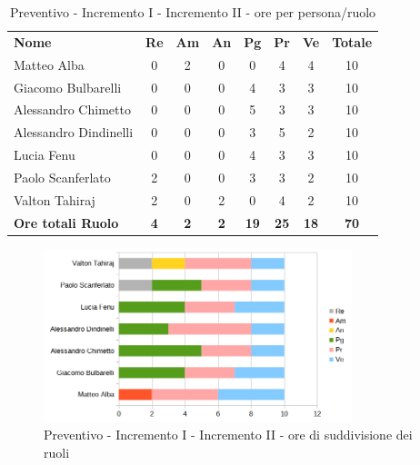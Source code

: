 	\begin{table} [h!]
	\begin{center}
		\begin{tabular} { m{3.5cm} c c c c c c c }
			\rowcolor{lightgray}
			\textbf{Nome} & \textbf{Re} & \textbf{Am} & \textbf{An} & \textbf{Pg} & \textbf{Pr} & \textbf{Ve} & \textbf{Totale} \\
			Matteo Alba &0 &2 & 0& 0 &4 & 4 & 10 \\
			Giacomo Bulbarelli & 0 &0 & 0& 4 & 3 & 3 & 10 \\
			Alessandro Chimetto & 0 & 0& 0& 5 & 3 & 3 & 10 \\
			Alessandro Dindinelli & 0& 0 & 0& 3 & 5 &2 & 10 \\
			Lucia Fenu & 0 & 0 &0 & 4 & 3 & 3 & 10 \\
			Paolo Scanferlato &2 & 0 &0 & 3 & 3 & 2 & 10 \\
			Valton Tahiraj & 2& 0 &2 & 0 & 4 & 2 & 10 \\
			\textbf{Ore totali Ruolo} & \textbf{4} & \textbf{2} & \textbf{2} & \textbf{19} & \textbf{25}& \textbf{18} & \textbf{70}
		\end{tabular}
		\caption{Preventivo - Incremento I - Incremento II - ore per persona/ruolo}
	\end{center}
\end{table}
	\begin{figure} [h!]
	\centering
	\includegraphics[width=0.8\textwidth]{res/img/preventivi/1e2-barre.png}
	\caption{Preventivo - Incremento I - Incremento II - ore di suddivisione dei ruoli} 
\end{figure}

\newpage

